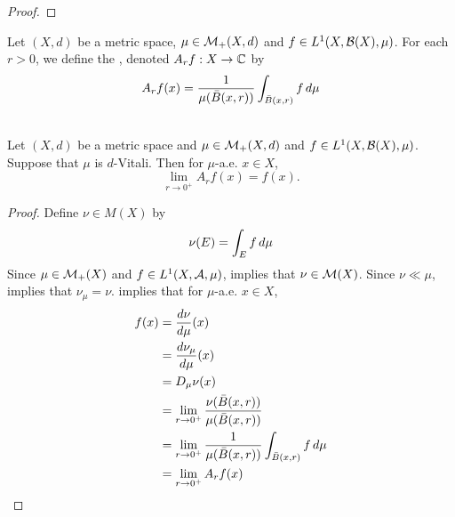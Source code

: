 \documentclass{book}
\begin{document}
	\begin{proof}
	\end{proof}
	
	\begin{defn} 
		Let $(X, d)$ be a metric space, $\mu \in \mathcal{M}_+(X, d)$ and $f \in L^1(X, \mathcal{B}(X), \mu)$. For each $r > 0$, we define the , denoted $A_rf: X \rightarrow \mathbb{C}$ by 
		$$A_rf(x) = \frac{1}{\mu(\bar{B}(x, r))} \int_{\bar{B}(x, r)} f \, d \mu$$
	\end{defn}

	\begin{ex}   \\
		Let $(X, d)$ be a metric space and $\mu \in \mathcal{M}_+(X, d)$ and $f \in L^1(X, \mathcal{B}(X), \mu)$. Suppose that $\mu$ is $d$-Vitali. Then for $\mu$-a.e. $x \in X$,
		$$\lim_{r \rightarrow 0^+} A_r f(x) = f(x).$$
	\end{ex}

	\begin{proof} 
		Define $\nu \in M(X)$ by 
		$$\nu(E) = \int_E f \, d \mu $$ 
		Since $\mu \in \mathcal{M}_+(X)$ and $f \in L^1(X, \mathcal{A}, \mu)$,  implies that $\nu \in \mathcal{M}(X)$. Since $\nu \ll \mu$,  implies that $\nu_{\mu} = \nu$.  implies that for $\mu$-a.e. $x \in X$,
		\begin{align*}
			f(x)
			& = \frac{d \nu}{d \mu}(x) \\
			& = \frac{d \nu_{\mu}}{d \mu}(x) \\
			& = D_{\mu} \nu(x) \\
			& = \lim_{r \rightarrow 0^+} \frac{\nu(\bar{B}(x,r))}{\mu(\bar{B}(x,r))} \\
			& = \lim_{r \rightarrow 0^+} \frac{1}{\mu(\bar{B}(x,r))} \int_{\bar{B}(x,r)} f \, d \mu  \\
			& = \lim_{r \rightarrow 0^+} A_r f(x)
		\end{align*} 
	\end{proof}
	
	
	
	
	
	
	
	
	
	
	
	
	
	
	
	
	
\end{document}
